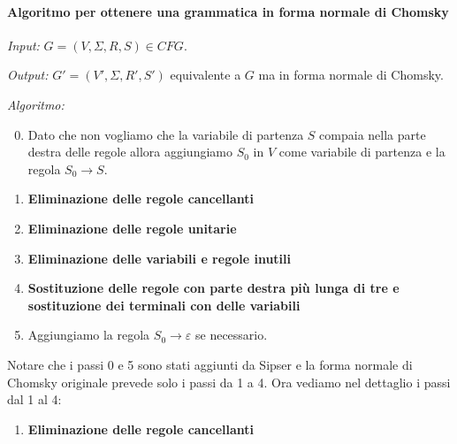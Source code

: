 \paragraph{Algoritmo per ottenere una grammatica in forma normale di Chomsky}
\begin{description}
	\item \emph{Input:} $G = (V, \Sigma, R, S) \in CFG$.
	\item \emph{Output:} $G' = (V', \Sigma, R', S')$ equivalente a $G$ ma in forma normale di Chomsky.
	\item \emph{Algoritmo:}
		\begin{enumerate}
			\setcounter{enumi}{-1}
			\item Dato che non vogliamo che la variabile di partenza $S$ compaia nella parte destra delle regole allora aggiungiamo $S_0$ in $V$ come variabile di partenza e la regola $S_0 \to S$.
			\item \textbf{Eliminazione delle regole cancellanti}
			\item \textbf{Eliminazione delle regole unitarie}
			\item \textbf{Eliminazione delle variabili e regole inutili}
			\item \textbf{Sostituzione delle regole con parte destra pi\`u lunga di tre e sostituzione dei terminali con delle variabili}
			\item Aggiungiamo la regola $S_0 \to \varepsilon$ se necessario.
		\end{enumerate}
		Notare che i passi 0 e 5 sono stati aggiunti da Sipser e la forma normale di Chomsky originale prevede solo i passi da 1 a 4.\newline
		Ora vediamo nel dettaglio i passi dal 1 al 4:
		\begin{enumerate}
			\item \textbf{Eliminazione delle regole cancellanti}
\end{enumerate}
\end{description}
